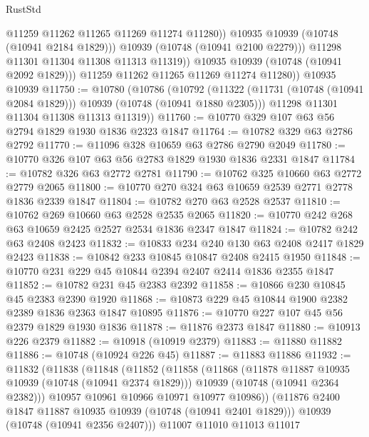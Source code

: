 \begin{lexlean}{RustStd}
\begin{coremodule}
{\begin{coremodule}
{{{{{                      @11259
                      @11262
                      @11265
                      @11269
                      @11274
                      @11280))
                  @10935
                  @10939
                  (@10748 (@10941 @2184 @1829)))
                @10939
                (@10748 (@10941 @2100 @2279)))
              @11298
              @11301
              @11304
              @11308
              @11313
              @11319))
          @10935
          @10939
          (@10748 (@10941 @2092 @1829)))
        @11259
        @11262
        @11265
        @11269
        @11274
        @11280))
    @10935
    @10939
@11750 := @10780
    (@10786
      (@10792
        (@11322 (@11731 (@10748 (@10941 @2084 @1829))) @10939 (@10748 (@10941 @1880 @2305)))
        @11298
        @11301
        @11304
        @11308
        @11313
        @11319))
@11760 := @10770 @329 @107 @63 @56 @2794 @1829 @1930 @1836 @2323 @1847
@11764 := @10782 @329 @63 @2786 @2792
@11770 := @11096 @328 @10659 @63 @2786 @2790 @2049
@11780 := @10770 @326 @107 @63 @56 @2783 @1829 @1930 @1836 @2331 @1847
@11784 := @10782 @326 @63 @2772 @2781
@11790 := @10762 @325 @10660 @63 @2772 @2779 @2065
@11800 := @10770 @270 @324 @63 @10659 @2539 @2771 @2778 @1836 @2339 @1847
@11804 := @10782 @270 @63 @2528 @2537
@11810 := @10762 @269 @10660 @63 @2528 @2535 @2065
@11820 := @10770 @242 @268 @63 @10659 @2425 @2527 @2534 @1836 @2347 @1847
@11824 := @10782 @242 @63 @2408 @2423
@11832 := @10833 @234 @240 @130 @63 @2408 @2417 @1829 @2423
@11838 := @10842 @233 @10845 @10847 @2408 @2415 @1950
@11848 := @10770 @231 @229 @45 @10844 @2394 @2407 @2414 @1836 @2355 @1847
@11852 := @10782 @231 @45 @2383 @2392
@11858 := @10866 @230 @10845 @45 @2383 @2390 @1920
@11868 := @10873 @229 @45 @10844 @1900 @2382 @2389 @1836 @2363 @1847 @10895
@11876 := @10770 @227 @107 @45 @56 @2379 @1829 @1930 @1836
@11878 := @11876 @2373 @1847
@11880 := @10913 @226 @2379
@11882 := @10918 (@10919 @2379)
@11883 := @11880 @11882
@11886 := @10748 (@10924 @226 @45)
@11887 := @11883 @11886
@11932 := @11832
    (@11838
      (@11848
        (@11852
          (@11858
            (@11868
              (@11878 @11887 @10935 @10939 (@10748 (@10941 @2374 @1829)))
              @10939
              (@10748 (@10941 @2364 @2382)))
            @10957
            @10961
            @10966
            @10971
            @10977
            @10986))
        (@11876 @2400 @1847 @11887 @10935 @10939 (@10748 (@10941 @2401 @1829)))
        @10939
        (@10748 (@10941 @2356 @2407)))
      @11007
      @11010
      @11013
      @11017
}}}}}
\end{coremodule}}
\end{coremodule}
\end{lexlean}
